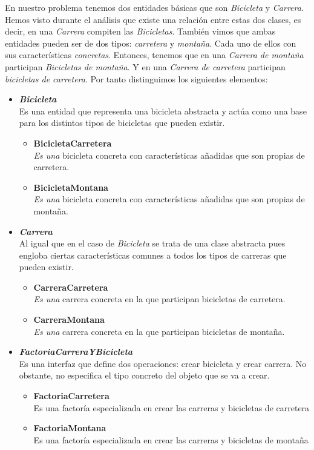 \documentclass{article}
\begin{document}
En nuestro problema tenemos dos entidades básicas que son \textit{Bicicleta} y \textit{Carrera}. Hemos visto durante el análisis que existe una relación entre estas  dos clases, es decir, en una \textit{Carrera} compiten las \textit{Bicicletas}. También vimos que ambas entidades pueden ser de dos tipos: \textit{carretera} y \textit{montaña}. Cada uno de ellos con sus características \textit{concretas}. 
Entonces, tenemos que en una \textit{Carrera de montaña} participan \textit{Bicicletas de montaña}. Y en una \textit{Carrera de carretera} participan \textit{bicicletas de carretera}.  Por tanto distinguimos los siguientes elementos:
\begin{itemize}
	
	\item  \textbf{\textit{Bicicleta}}\\ Es una entidad que representa una bicicleta abstracta y actúa como una base para los distintos tipos de bicicletas que pueden existir.
	\begin{itemize}
		\item \textbf{BicicletaCarretera}\\\textit{Es una} bicicleta concreta con características añadidas que son propias de carretera.
		\item \textbf{BicicletaMontana}\\\textit{Es una} bicicleta concreta con características añadidas que son propias de montaña.
	\end{itemize}
	
	\item \textbf{\textit{Carrera}}\\Al igual que en el caso de \textit{Bicicleta} se trata de una clase abstracta pues engloba ciertas características comunes a todos los tipos de carreras que pueden existir. 
	\begin{itemize}
		\item \textbf{CarreraCarretera}\\\textit{Es una} carrera concreta en la que participan bicicletas de carretera.
		\item \textbf{CarreraMontana}\\\textit{Es una} carrera concreta  en la que participan bicicletas de montaña.
	\end{itemize}
	 
	\newpage
	\item \textbf{\textit{FactoriaCarreraYBicicleta}}\\
	Es una interfaz que define dos operaciones: crear bicicleta y crear carrera. No obstante, no especifica el tipo concreto del objeto que se va a crear. 
	\begin{itemize}
		\item \textbf{FactoriaCarretera}\\Es  una factoría especializada en crear las carreras y bicicletas de carretera
			\item \textbf{FactoriaMontana}\\Es  una factoría especializada en crear las carreras y bicicletas de montaña
	\end{itemize}
		
	\end{itemize}
\end{document}
